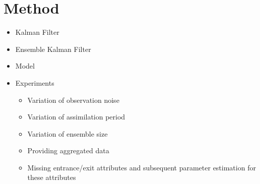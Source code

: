 \section{Method}\label{sec:method}

\begin{itemize}
    \item Kalman Filter
    \item Ensemble Kalman Filter
    \item Model
    \item Experiments
    \begin{itemize}
        \item Variation of observation noise
        \item Variation of assimilation period
        \item Variation of ensemble size
        \item Providing aggregated data
        \item Missing entrance/exit attributes and subsequent parameter
            estimation for these attributes
    \end{itemize}
\end{itemize}
